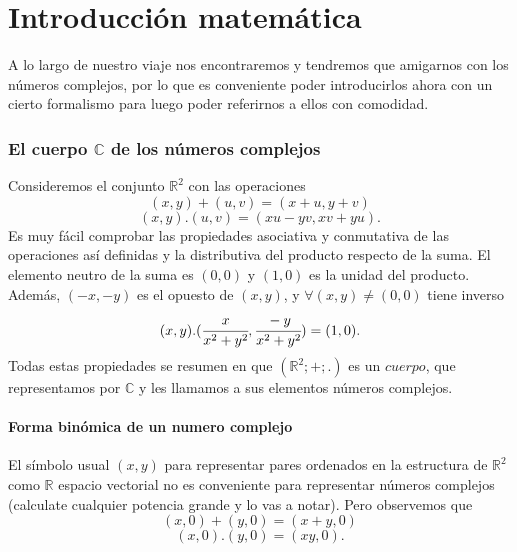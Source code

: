 \documentclass[a4paper,spanish]{article}
\def\C {\mathbb{C}}
\def\R {\mathbb{R}}
\numberwithin{equation}{section}
\begin{document}
\part{Introducci\'on matem\'atica}

A lo largo de nuestro viaje nos encontraremos y tendremos que amigarnos con los n\'umeros complejos, por lo que es conveniente poder introducirlos ahora con un cierto formalismo para luego
poder referirnos a ellos con comodidad.

\section{El cuerpo $\C$ de los n\'umeros complejos}
Consideremos el conjunto $\R^2$ con las operaciones\\
$$\displaystyle (x,y)+(u,v)=(x+u,y+v)$$
$$\displaystyle (x,y).(u,v)=(xu-yv,xv+yu).$$
Es muy f\'acil comprobar las propiedades asociativa y conmutativa
de las operaciones as\'i­ definidas y la distributiva del producto
respecto de la suma. El elemento neutro de la suma es $(0,0)$ y
$(1,0)$ es la unidad del producto. Adem\'as,
$(-x,-y)$ es el opuesto de $(x,y)$, y
$\forall (x,y) \neq (0,0)$ tiene inverso
\[\displaystyle
(x,y).(\cfrac{x}{x^2+y^2},\cfrac{-y}{x^2+y^2})=(1,0).\] Todas estas
propiedades se resumen en que $(\R^2;+;.)$ es un
$\textit{cuerpo}$, que representamos por $\C$ y les llamamos a sus
elementos n\'umeros complejos.

\subsection{Forma bin\'omica de un numero complejo}

El s\'imbolo usual $\displaystyle(x,y)$ para representar pares
ordenados en la estructura de $\R^2$ como $\R$ espacio vectorial
no es conveniente para representar n\'umeros complejos (calculate
cualquier potencia grande y lo vas a notar). Pero observemos que
\[(x,0)+(y,0)=(x+y,0)\]
\[(x,0).(y,0)=(xy,0).\]
\end{document}

